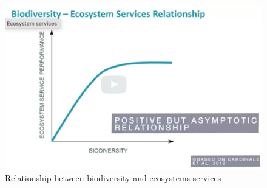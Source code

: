 \documentclass[../summary.tex]{subfiles}
\begin{document}
	\begin{figure}[htbp]
		\centering
		\includegraphics[width=1\linewidth]{images/2-biodiversity-ecosystem-services-relationship.png}
		\caption{Relationship between biodiversity and ecosystems services}
		\label{fig:relationship_biodiversity_ecosystems_services}
	\end{figure} 
	
\end{document}
